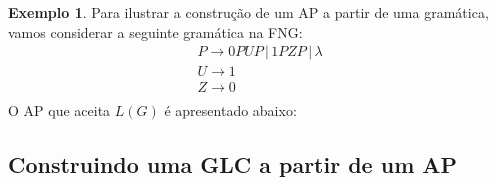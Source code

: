 \documentclass[a4paper]{article}
\theoremstyle{definition}
\newtheorem{Example}{Exemplo}
\begin{document}
  \begin{Example}
    Para ilustrar a construção de um AP a partir de uma gramática, vamos
    considerar a seguinte gramática na FNG:
    \[
      \begin{array}{l}
        P \to 0PUP\,|\,1PZP\,|\,\lambda\\
        U \to 1 \\
        Z \to 0 \\
      \end{array}
    \]
    O AP que aceita $L(G)$ é apresentado abaixo:
    \begin{figure}[H]
      \centering
    \end{figure}
  \end{Example}

  \subsection{Construindo uma GLC a partir de um AP}
\end{document}
